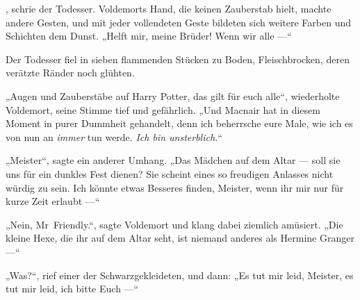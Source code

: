 , schrie der Todesser.
Voldemorts Hand, die keinen Zauberstab hielt, machte andere Gesten, und mit jeder vollendeten Geste bildeten sich weitere Farben und Schichten dem Dunst.
„Helft mir, meine Brüder! Wenn wir alle —“

Der Todesser fiel in sieben flammenden Stücken zu Boden, Fleischbrocken, deren verätzte Ränder noch glühten.

„Augen und Zauberstäbe auf Harry Potter, das gilt für euch alle“, wiederholte Voldemort, seine Stimme tief und gefährlich.
„Und Macnair hat in diesem Moment in purer Dummheit gehandelt, denn ich beherrsche eure Male, wie ich es von nun an \emph{immer} tun werde. \emph{Ich bin unsterblich.}“

„Meister“, sagte ein anderer Umhang.
„Das Mädchen auf dem Altar — soll sie uns für ein dunkles Fest dienen? Sie scheint eines so freudigen Anlasses nicht würdig zu sein. Ich könnte etwas Besseres finden, Meister, wenn ihr mir nur für kurze Zeit erlaubt —“

„Nein, Mr~Friendly.“, sagte Voldemort und klang dabei ziemlich amüsiert.
„Die kleine Hexe, die ihr auf dem Altar seht, ist niemand anderes als Hermine Granger —“

„Was?“, rief einer der Schwarzgekleideten, und dann:
„Es tut mir leid, Meister, es tut mir leid, ich bitte Euch —“

